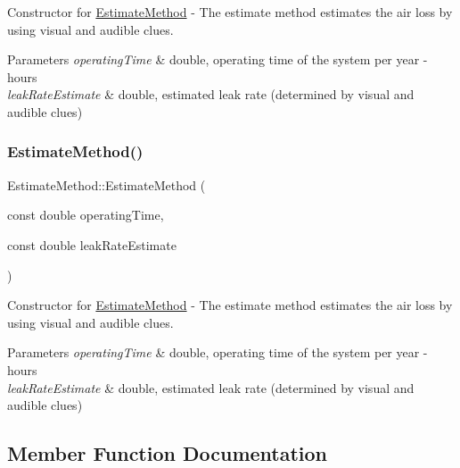 Constructor for \hyperlink{class_estimate_method}{Estimate\+Method} -\/ The estimate method estimates the air loss by using visual and audible clues. 
\begin{DoxyParams}{Parameters}
{\em operating\+Time} & double, operating time of the system per year -\/ hours \\
\hline
{\em leak\+Rate\+Estimate} & double, estimated leak rate (determined by visual and audible clues) \\
\hline
\end{DoxyParams}
\mbox{\label{class_estimate_method_a06b06991a5f48051a6c698be0fa31f1d}} 
\subsubsection{\texorpdfstring{Estimate\+Method()}{EstimateMethod()}\hspace{0.1cm}{\footnotesize\ttfamily [3/3]}}
{\footnotesize\ttfamily Estimate\+Method\+::\+Estimate\+Method (\begin{DoxyParamCaption}\item[{const double}]{operating\+Time,  }\item[{const double}]{leak\+Rate\+Estimate }\end{DoxyParamCaption})}

Constructor for \hyperlink{class_estimate_method}{Estimate\+Method} -\/ The estimate method estimates the air loss by using visual and audible clues. 
\begin{DoxyParams}{Parameters}
{\em operating\+Time} & double, operating time of the system per year -\/ hours \\
\hline
{\em leak\+Rate\+Estimate} & double, estimated leak rate (determined by visual and audible clues) \\
\hline
\end{DoxyParams}


\subsection{Member Function Documentation}
\mbox{\label{class_estimate_method_af20250d9f657cf7443b9cea66e0dab9e}} 
